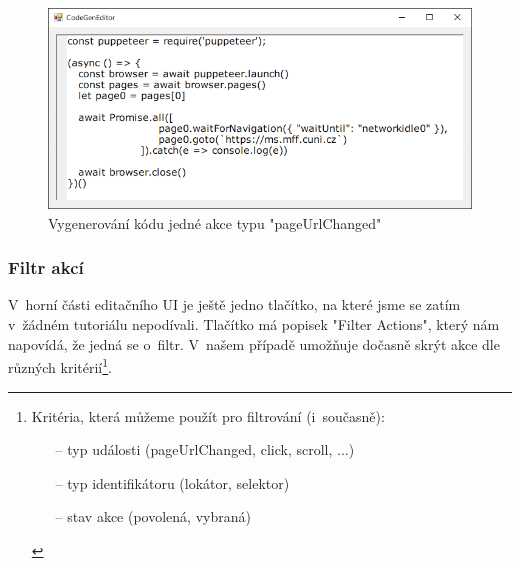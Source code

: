 \documentclass[12pt, a4paper, twoside]{article}
\begin{document}
	\begin{figure}[H]\ContinuedFloat
		\centering
		\includegraphics[width=1.0\textwidth]{pageUrlChangedCodeGen.png}
		\caption{Vygenerování kódu jedné akce typu "pageUrlChanged"}
	\end{figure}
	\subsubsection{Filtr akcí}
	V~horní části editačního UI je ještě jedno tlačítko, na které jsme se zatím v~žádném tutoriálu nepodívali. Tlačítko má popisek "Filter Actions", který nám napovídá, že jedná se o~filtr. V~našem případě umožňuje dočasně skrýt akce dle různých kritérií\footnote{Kritéria, která můžeme použít pro filtrování (i~současně):
		\begin{itemize}[noitemsep, topsep=1pt]
			\item[--] typ události (pageUrlChanged, click, scroll, ...)
			\item[--] typ identifikátoru (lokátor, selektor)
			\item[--] stav akce (povolená, vybraná)
		\end{itemize} 
	}.
\end{document}
